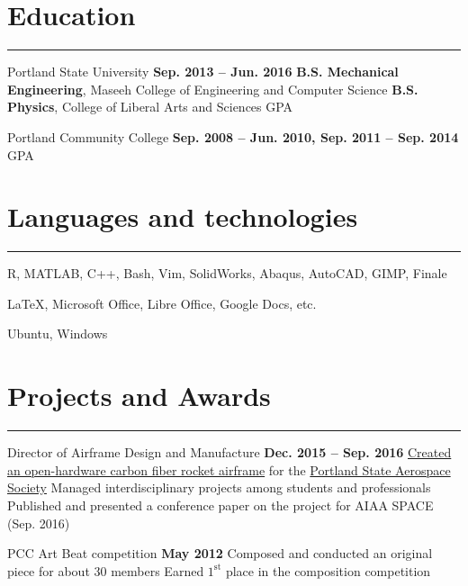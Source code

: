 \section{Education}
	\noindent\rule{\textwidth}{\hlinewidth}
	\begin{innerlist}
	\item Portland State University		\hfill\textbf{Sep. 2013 -- Jun. 2016}
		\subitem \textbf{B.S. Mechanical Engineering}, Maseeh College of Engineering and Computer Science 
		\subitem\textbf{B.S. Physics}, College of Liberal Arts and Sciences
		 GPA
	\\
	\item Portland Community College  \hfill\textbf{Sep. 2008 -- Jun. 2010, Sep. 2011 -- Sep. 2014}
		 GPA
	\end{innerlist}
\vfill
\section{Languages and technologies}

\noindent\rule{\textwidth}{\hlinewidth}
    \begin{innerlist}
        \item R, MATLAB, C++, Bash, Vim, SolidWorks, Abaqus, AutoCAD, GIMP, Finale
        \item \LaTeX, Microsoft Office, Libre Office, Google Docs, etc.
	\item Ubuntu, Windows
    \end{innerlist}
\vfill
\section{Projects and Awards}
\noindent\rule{\textwidth}{\hlinewidth}
	\begin{innerlist}
	\item Director of Airframe Design and Manufacture
		\hfill\textbf{Dec. 2015 -- Sep. 2016} %
		\subitem \href{https://github.com/psas/sw-cad-airframe-lv3.0}{Created 
			an open-hardware carbon fiber rocket airframe} for the 
			\href{http://psas.pdx.edu/}{Portland State Aerospace Society}
		\subitem Managed interdisciplinary projects among students and professionals
		\subitem Published and presented a conference paper on the project for AIAA SPACE (Sep. 2016)
	\\
	\item PCC Art Beat competition \hfill\textbf{May 2012}
		\subitem Composed and conducted an original piece for about 30 members
		\subitem Earned $1^\text{st}$ place in the composition competition
	\end{innerlist}
\vfill
